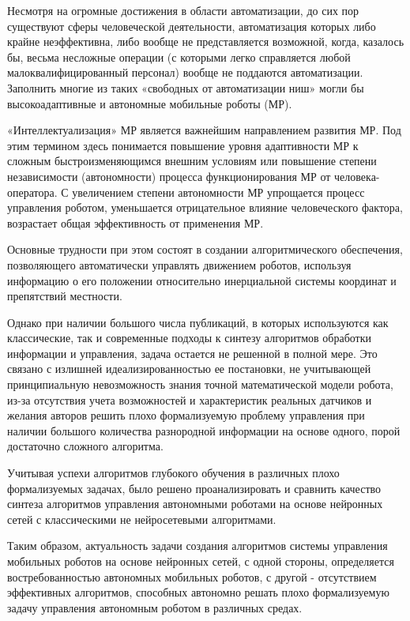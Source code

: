 

Несмотря на огромные достижения в области автоматизации, до сих пор существуют сферы человеческой деятельности, автоматизация которых либо крайне неэффективна, либо вообще не представляется возможной, когда, казалось бы, весьма несложные операции (с которыми легко справляется любой малоквалифицированный персонал) вообще не поддаются автоматизации. Заполнить многие из таких «свободных от автоматизации ниш» могли бы высокоадаптивные и автономные мобильные роботы (МР). 


«Интеллектуализация» МР является важнейшим направлением развития МР. Под этим термином здесь понимается повышение уровня адаптивности МР к сложным быстроизменяющимся внешним условиям или повышение степени независимости (автономности) процесса функционирования МР от человека-оператора. С увеличением степени автономности МР упрощается процесс управления роботом, уменьшается отрицательное влияние человеческого фактора, возрастает общая эффективность от применения МР.


Основные трудности при этом состоят в создании алгоритмического обеспечения, позволяющего автоматически управлять движением роботов, используя информацию о его положении относительно инерциальной системы координат и препятствий местности.


Однако при наличии большого числа публикаций, в которых используются как классические, так и современные подходы к синтезу алгоритмов обработки информации и управления, задача остается не решенной в полной мере. Это связано с излишней идеализированностью ее постановки, не учитывающей принципиальную невозможность знания точной математической модели робота, из-за отсутствия учета возможностей и характеристик реальных датчиков и желания авторов решить плохо формализуемую проблему управления при наличии большого количества разнородной информации на основе одного, порой достаточно сложного алгоритма.


Учитывая успехи алгоритмов глубокого обучения в различных плохо формализуемых задачах, было решено проанализировать и сравнить качество синтеза алгоритмов управления автономными роботами  на основе нейронных сетей с классическими не нейросетевыми алгоритмами.


Таким образом, актуальность задачи создания алгоритмов системы управления мобильных роботов на основе нейронных сетей, с одной стороны, определяется востребованностью автономных мобильных роботов, с другой - отсутствием эффективных алгоритмов, способных автономно решать плохо формализуемую задачу управления автономным роботом в различных средах.


\clearpage
